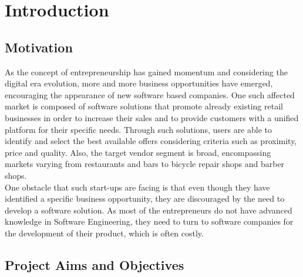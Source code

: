 \section{Introduction}

\subsection{Motivation} 

As the concept of entrepreneurship has gained momentum and considering the digital era evolution, more and more business opportunities have emerged, encouraging the appearance of new software based companies. One such affected market is composed of software solutions that promote already existing retail businesses in order to increase their sales and to provide customers with a unified platform for their specific needs. Through such solutions, users are able to identify and select the best available offers considering criteria such as proximity, price and quality. Also, the target vendor segment is broad, encompassing markets varying from restaurants and bars to bicycle repair shops and barber shops.\\

One obstacle that such start-ups are facing is that even though they have identified a specific business opportunity, they are discouraged by the need to develop a software solution. As most of the entrepreneurs do not have advanced knowledge in Software Engineering, they need to turn to software companies for the development of their product, which is often costly.\\

\subsection{Project Aims and Objectives}

